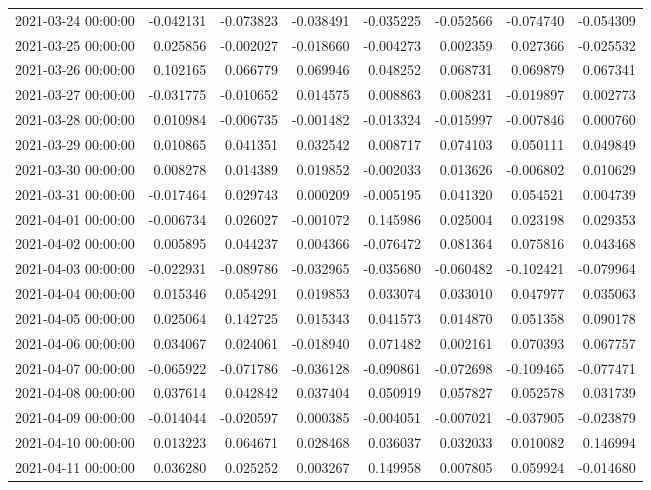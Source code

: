 \begin{tabular}{lrrrrrrr}
2021-03-24 00:00:00 & -0.042131 & -0.073823 & -0.038491 & -0.035225 & -0.052566 & -0.074740 & -0.054309 \\
2021-03-25 00:00:00 & 0.025856 & -0.002027 & -0.018660 & -0.004273 & 0.002359 & 0.027366 & -0.025532 \\
2021-03-26 00:00:00 & 0.102165 & 0.066779 & 0.069946 & 0.048252 & 0.068731 & 0.069879 & 0.067341 \\
2021-03-27 00:00:00 & -0.031775 & -0.010652 & 0.014575 & 0.008863 & 0.008231 & -0.019897 & 0.002773 \\
2021-03-28 00:00:00 & 0.010984 & -0.006735 & -0.001482 & -0.013324 & -0.015997 & -0.007846 & 0.000760 \\
2021-03-29 00:00:00 & 0.010865 & 0.041351 & 0.032542 & 0.008717 & 0.074103 & 0.050111 & 0.049849 \\
2021-03-30 00:00:00 & 0.008278 & 0.014389 & 0.019852 & -0.002033 & 0.013626 & -0.006802 & 0.010629 \\
2021-03-31 00:00:00 & -0.017464 & 0.029743 & 0.000209 & -0.005195 & 0.041320 & 0.054521 & 0.004739 \\
2021-04-01 00:00:00 & -0.006734 & 0.026027 & -0.001072 & 0.145986 & 0.025004 & 0.023198 & 0.029353 \\
2021-04-02 00:00:00 & 0.005895 & 0.044237 & 0.004366 & -0.076472 & 0.081364 & 0.075816 & 0.043468 \\
2021-04-03 00:00:00 & -0.022931 & -0.089786 & -0.032965 & -0.035680 & -0.060482 & -0.102421 & -0.079964 \\
2021-04-04 00:00:00 & 0.015346 & 0.054291 & 0.019853 & 0.033074 & 0.033010 & 0.047977 & 0.035063 \\
2021-04-05 00:00:00 & 0.025064 & 0.142725 & 0.015343 & 0.041573 & 0.014870 & 0.051358 & 0.090178 \\
2021-04-06 00:00:00 & 0.034067 & 0.024061 & -0.018940 & 0.071482 & 0.002161 & 0.070393 & 0.067757 \\
2021-04-07 00:00:00 & -0.065922 & -0.071786 & -0.036128 & -0.090861 & -0.072698 & -0.109465 & -0.077471 \\
2021-04-08 00:00:00 & 0.037614 & 0.042842 & 0.037404 & 0.050919 & 0.057827 & 0.052578 & 0.031739 \\
2021-04-09 00:00:00 & -0.014044 & -0.020597 & 0.000385 & -0.004051 & -0.007021 & -0.037905 & -0.023879 \\
2021-04-10 00:00:00 & 0.013223 & 0.064671 & 0.028468 & 0.036037 & 0.032033 & 0.010082 & 0.146994 \\
2021-04-11 00:00:00 & 0.036280 & 0.025252 & 0.003267 & 0.149958 & 0.007805 & 0.059924 & -0.014680 \\

\end{tabular}
